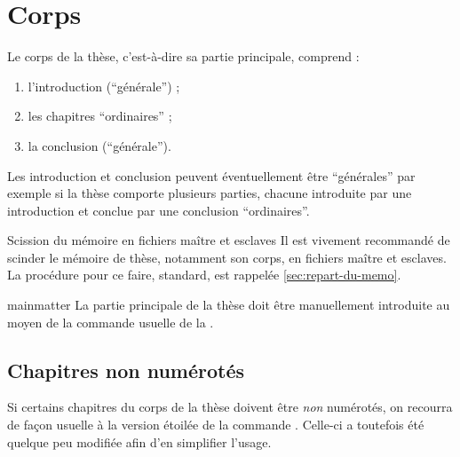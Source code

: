 \chapter{Corps}\label{cha:corps}

Le corps de la thèse, c'est-à-dire sa partie principale, comprend :
\begin{enumerate}
\item l'introduction (\enquote{générale}) ;
\item les chapitres \enquote{ordinaires} ;
\item la conclusion (\enquote{générale}).
\end{enumerate}
Les introduction et conclusion peuvent éventuellement être
\enquote{générales} par exemple si la thèse comporte plusieurs
parties, chacune introduite par une introduction et conclue par
une conclusion \enquote{ordinaires}.

\begin{dbremark}{Scission du mémoire en fichiers maître et esclaves}{}
  Il est vivement recommandé de scinder le mémoire de thèse,
  notamment son corps, en fichiers maître et esclaves. La procédure
  pour ce faire, standard, est rappelée \vref{sec:repart-du-memo}.
\end{dbremark}

\begin{docCommand}[doc description=\mandatory]{mainmatter}{}
  La partie principale de la thèse doit être manuellement introduite au moyen
  de la commande usuelle  de la
  \nofrontmatter.
\end{docCommand}

\section{Chapitres non numérotés}
\label{sec:chap-non-numer}

Si certains chapitres du corps de la thèse  doivent être \emph{non} numérotés, on recourra de
façon usuelle à la version étoilée de la commande
. Celle-ci a toutefois été quelque peu modifiée afin
d'en simplifier l'usage.

